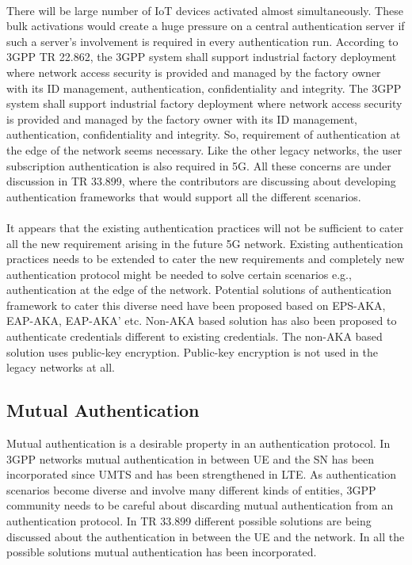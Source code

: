 \documentclass[lnicst,sechang,a4paper]{svmultln}
\begin{document}
\paragraph{}
There will be large number of IoT devices activated almost simultaneously. These bulk activations would create a huge pressure on a central authentication server if such a server's involvement is required in every authentication run. According to 3GPP TR 22.862, the 3GPP system shall support industrial factory deployment where network access security is provided and managed by the factory owner with its ID management, authentication, confidentiality and integrity. The 3GPP system shall support industrial factory deployment where network access security is provided and managed
by the factory owner with its ID management, authentication, confidentiality and integrity. So, requirement of authentication at the edge of the network seems necessary. Like the other legacy networks, the user subscription authentication is also required in 5G. All these concerns are under discussion in TR 33.899, where the contributors are discussing about developing authentication frameworks that would support all the different scenarios. 
\paragraph{}
It appears that the existing authentication practices will not be sufficient to cater all the new requirement arising in the future 5G network. Existing authentication practices needs to be extended to cater the new requirements and completely new authentication protocol might be needed to solve certain scenarios e.g., authentication at the edge of the network. Potential solutions of authentication framework to cater this diverse need have been proposed based on EPS-AKA, EAP-AKA, EAP-AKA' etc. Non-AKA based solution has also been proposed to authenticate credentials different to existing credentials. The non-AKA based solution uses public-key encryption. Public-key encryption is not used in the legacy networks at all.  

\subsection{Mutual Authentication}
Mutual authentication is a desirable property in an authentication protocol. In 3GPP networks mutual authentication in between UE and the SN has been incorporated since UMTS and has been strengthened in LTE. As authentication scenarios become diverse and involve many different kinds of entities, 3GPP community needs to be careful about discarding mutual authentication from an authentication protocol. In TR 33.899 different possible solutions are being discussed about the authentication in between the UE and the network. In all the possible solutions mutual authentication has been incorporated. 
\end{document}
